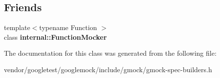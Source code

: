 \subsection*{Friends}
\begin{DoxyCompactItemize}
\item 
{\footnotesize template$<$typename Function $>$ }\\class {\bfseries internal\+::\+Function\+Mocker}\hypertarget{classtesting_1_1internal_1_1MockSpec_a6980863fff8693124aff79c507f87d45}{}\label{classtesting_1_1internal_1_1MockSpec_a6980863fff8693124aff79c507f87d45}

\end{DoxyCompactItemize}


The documentation for this class was generated from the following file\+:\begin{DoxyCompactItemize}
\item 
vendor/googletest/googlemock/include/gmock/gmock-\/spec-\/builders.\+h\end{DoxyCompactItemize}
